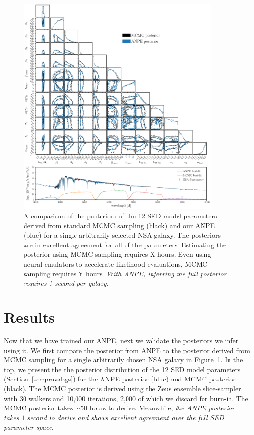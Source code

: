 \begin{figure}
\begin{center}
    \includegraphics[width=0.9\textwidth]{figs/corner.pdf}
    \caption{\label{fig:corner}
    A comparison of the posteriors of the 12 SED model parameters derived from
    standard MCMC sampling (black) and our ANPE (blue) for a single arbitrarily
    selected NSA galaxy.
    The posteriors are in excellent agreement for all of the parameters. 
    Estimating the posterior using MCMC sampling requires X hours. 
    Even using neural emulators to accelerate likelihood evaluations, MCMC
    sampling requires Y hours. 
    \emph{With ANPE, inferring the full posterior requires 1 second per
    galaxy.}
    }
\end{center}
\end{figure}

\section{Results} \label{sec:results}
Now that we have trained our ANPE, next we validate the posteriors we infer
using it. 
We first compare the posterior from ANPE to the posterior derived from MCMC
sampling for a single arbitrarily chosen NSA galaxy in Figure~\ref{fig:corner}. 
In the top, we present the the posterior distribution of the 12 SED model
parameters (Section~\ref{sec:provabgs}) for the ANPE posterior (blue) and MCMC
posterior (black). 
The MCMC posterior is derived using the {\sc Zeus} ensemble
slice-sampler~\citep{karamanis2020} with 30 walkers and 10,000 iterations,
2,000 of which we discard for burn-in. 
The MCMC posterior takes $\sim$50 hours to derive.
Meanwhile, \emph{the ANPE posterior takes $1$ second to derive and shows
excellent agreement over the full SED parameter space}. 
 
